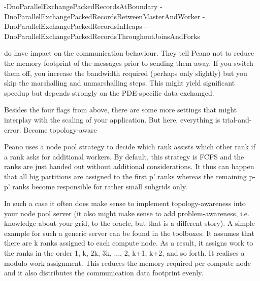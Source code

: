 -DnoParallelExchangePackedRecordsAtBoundary
-DnoParallelExchangePackedRecordsBetweenMasterAndWorker
-DnoParallelExchangePackedRecordsInHeaps
-DnoParallelExchangePackedRecordsThroughoutJoinsAndForks

do have impact on the communication behaviour. They tell Peano not to reduce the memory footprint of the messages prior to sending them away. If you switch them off, you increase the bandwidth required (perhaps only slightly) but you skip the marshalling and unmarshalling steps. This might yield significant speedup but depends strongly on the PDE-specific data exchanged.

Besides the four flags from above, there are some more settings that might interplay with the scaling of your application. But here, everything is trial-and-error.
Become topology-aware

Peano uses a node pool strategy to decide which rank assists which other rank if a rank asks for additional workers. By default, this strategy is FCFS and the ranks are just handed out without additional considerations. It thus can happen that all big partitions are assigned to the first p' ranks whereas the remaining p-p' ranks become responsible for rather small subgrids only.

In such a case it often does make sense to implement topology-awareness into your node pool server (it also might make sense to add problem-awareness, i.e. knowledge about your grid, to the oracle, but that is a different story). A simple example for such a generic server can be found in the toolboxes. It assumes that there are k ranks assigned to each compute node. As a result, it assigns work to the ranks in the order 1, k, 2k, 3k, ..., 2, k+1, k+2, and so forth. It realises a modulo work assignment. This reduces the memory required per compute node and it also distributes the communication data footprint evenly.   